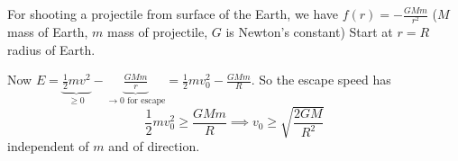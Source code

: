 \documentclass[10pt, a4paper]{article}
\begin{document}
\begin{example}
    For shooting a projectile from surface of the Earth,
    we have $f(r) = -\frac{GMm}{r ^ 2}$
    ($M$ mass of Earth,
    $m$ mass of projectile,
    $G$ is Newton's constant)
    Start at $r = R$ radius of Earth.

    \begin{solution}
        Now $E = \underbrace{\frac{1}{2}mv ^ 2}_{\geq 0} - \underbrace{\frac{GMm}{r}}_{\rightarrow 0\text{ for escape}} = \frac{1}{2}mv_0 ^ 2 - \frac{GMm}{R}$.
        So the escape speed has
        \[
        \frac{1}{2}mv_0 ^ 2 \geq \frac{GMm}{R} \implies v_0 \geq \sqrt{\frac{2GM}{R ^ 2}}
        \]
        independent of $m$ and of direction.
    \end{solution}
\end{example}
\end{document}
